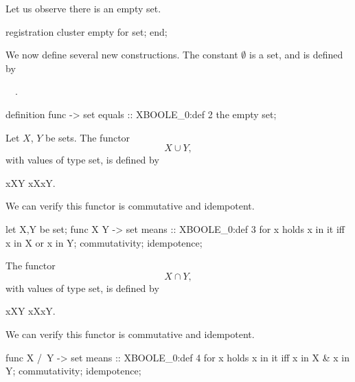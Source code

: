 \begin{paracol}{2}
\switchcolumn*\ensurevspace{5cm}

\noindent Let us observe there is an empty set.

\switchcolumn

\begin{mizar}
registration
  cluster empty for set;
end;
\end{mizar}

\switchcolumn*\ensurevspace{5cm}

We now define several new constructions. The constant $\emptyset$ is a set, and is
defined by
\begin{definition}
\emptyset\is\ \THE {}\ .
\end{definition}

\switchcolumn

\begin{mizar}
definition
  func {} -> set
  equals :: XBOOLE_0:def 2
  the empty set;
\end{mizar}

\switchcolumn*\ensurevspace{5cm}\noindent%
Let $X$, $Y$ be sets. The functor
\[ X\cup Y,\]
with values of type set, is defined by
\begin{definition}
x\in X\cup Y \iff x\in X\lor x\in Y. 
\end{definition}
We can verify this functor is commutative and idempotent.

\switchcolumn

\begin{mizar}
  let X,Y be set;
  func X \/ Y -> set
  means :: XBOOLE_0:def 3
  for x holds x in it
  iff x in X or x in Y;
  commutativity;
  idempotence;
\end{mizar}

\switchcolumn*\ensurevspace{5cm}\sloppy\noindent%
The functor
\[ X\cap Y,\]
with values of type set, is defined by
\begin{definition}
x\in X\cap Y \iff x\in X\land x\in Y.
\end{definition}
We can verify this functor is commutative and idempotent.

\switchcolumn

\begin{mizar}
  func X /\ Y -> set
  means :: XBOOLE_0:def 4
  for x holds x in it
  iff x in X & x in Y;
  commutativity;
  idempotence;
\end{mizar}


\end{paracol}
